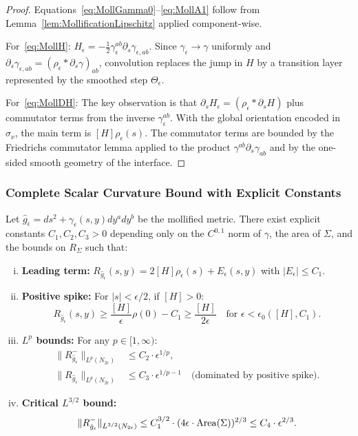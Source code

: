 \begin{proof}
Equations~\eqref{eq:MollGamma0}--\eqref{eq:MollA1} follow from Lemma~\ref{lem:MollificationLipschitz} applied component-wise.

For~\eqref{eq:MollH}: $H_\epsilon = -\frac{1}{2} \gamma^{ab}_\epsilon \partial_s \gamma_{\epsilon, ab}$. Since $\gamma_\epsilon \to \gamma$ uniformly and $\partial_s \gamma_{\epsilon, ab} = (\rho_\epsilon * \partial_s \gamma)_{ab}$, convolution replaces the jump in \(H\) by a transition layer represented by the smoothed step \(\Theta_\epsilon\).

For~\eqref{eq:MollDH}: The key observation is that $\partial_s H_\epsilon = (\rho_\epsilon * \partial_s H)$ plus commutator terms from the inverse $\gamma^{ab}_\epsilon$. With the global orientation encoded in \(\sigma_\nu\), the main term is \([H]\rho_\epsilon(s)\). The commutator terms are bounded by the Friedrichs commutator lemma applied to the product $\gamma^{ab} \partial_s \gamma_{ab}$ and by the one-sided smooth geometry of the interface.
\end{proof}

\subsubsection{Complete Scalar Curvature Bound with Explicit Constants}

\begin{theorem}
\label{thm:QuantitativeScalarControl}
Let $\hat{g}_\epsilon = ds^2 + \gamma_\epsilon(s, y) dy^a dy^b$ be the mollified metric. There exist explicit constants $C_1, C_2, C_3 > 0$ depending only on the $C^{0,1}$ norm of $\gamma$, the area of $\Sigma$, and the bounds on $R_\Sigma$ such that:
\begin{enumerate}[(i)]
\item \textbf{Leading term:} $R_{\hat{g}_\epsilon}(s, y) = 2[H] \rho_\epsilon(s) + E_\epsilon(s, y)$ with $|E_\epsilon| \le C_1$.
\item \textbf{Positive spike:} For $|s| < \epsilon/2$, if $[H] > 0$:
\[
R_{\hat{g}_\epsilon}(s, y) \ge \frac{[H]}{\epsilon} \rho(0) - C_1 \ge \frac{[H]}{2\epsilon} \quad \text{for } \epsilon < \epsilon_0([H], C_1).
\]
\item \textbf{$L^p$ bounds:} For any $p \in [1, \infty)$:
\begin{align}
\|R^-_{\hat{g}_\epsilon}\|_{L^p(N_{2\epsilon})} &\le C_2 \cdot \epsilon^{1/p}, \\
\|R_{\hat{g}_\epsilon}\|_{L^p(N_{2\epsilon})} &\le C_3 \cdot \epsilon^{1/p - 1} \quad \text{(dominated by positive spike)}.
\end{align}
\item \textbf{Critical $L^{3/2}$ bound:}
\[
\|R^-_{\hat{g}_\epsilon}\|_{L^{3/2}(N_{2\epsilon})} \le C_1^{3/2} \cdot (4\epsilon \cdot \operatorname{Area}(\Sigma))^{2/3} \le C_4 \cdot \epsilon^{2/3}.
\]
\end{enumerate}
\end{theorem}


